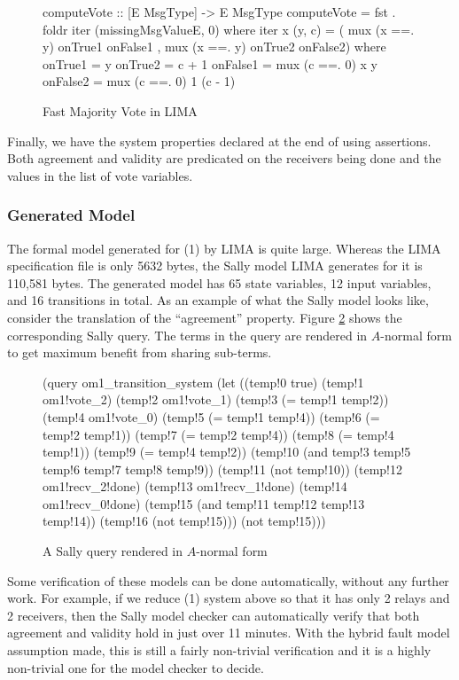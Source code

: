 \begin{figure}
\begin{lima}
computeVote :: [E MsgType] -> E MsgType
computeVote = fst . foldr iter (missingMsgValueE, 0)
  where
    iter x (y, c) = ( mux (x ==. y) onTrue1 onFalse1
                    , mux (x ==. y) onTrue2 onFalse2)
      where
        onTrue1       = y
        onTrue2       = c + 1
        onFalse1      = mux (c ==. 0) x y
        onFalse2      = mux (c ==. 0) 1 (c - 1)
\end{lima}
\caption{Fast Majority Vote in LIMA}
\label{fig:majority-vote}
\end{figure}

Finally, we have the system properties declared at the end of  using
assertions. Both agreement and validity are predicated on the receivers being
done and the values in the list of vote variables.

\subsubsection{Generated Model}\label{sssec:om1-sally-model}

The formal model generated for \OM(1) by LIMA is quite large. Whereas the LIMA
specification file is only 5632 bytes, the Sally model LIMA generates for it
is 110,581 bytes. The generated model has 65 state variables, 12 input
variables, and 16 transitions in total. As an example of what the Sally model
looks like, consider the translation of the ``agreement'' property. Figure
\ref{fig:sally-query} shows the corresponding Sally query. The terms in the
query are rendered in $A$-normal form \cite{Sabry-Felleisen} to get maximum
benefit from sharing sub-terms.

\begin{figure}
\begin{sally}
(query
 om1_transition_system
 (let
  ((temp!0 true)
   (temp!1 om1!vote_2)
   (temp!2 om1!vote_1)
   (temp!3 (= temp!1 temp!2))
   (temp!4 om1!vote_0)
   (temp!5 (= temp!1 temp!4))
   (temp!6 (= temp!2 temp!1))
   (temp!7 (= temp!2 temp!4))
   (temp!8 (= temp!4 temp!1))
   (temp!9 (= temp!4 temp!2))
   (temp!10 (and temp!3 temp!5 temp!6 temp!7 temp!8 temp!9))
   (temp!11 (not temp!10))
   (temp!12 om1!recv_2!done)
   (temp!13 om1!recv_1!done)
   (temp!14 om1!recv_0!done)
   (temp!15 (and temp!11 temp!12 temp!13 temp!14))
   (temp!16 (not temp!15)))
  (not temp!15)))
\end{sally}
\caption{A Sally query rendered in $A$-normal form}
\label{fig:sally-query}
\end{figure}

Some verification of these models can be done automatically, without any
further work. For example, if we reduce \OM(1) system above so that it has
only 2 relays and 2 receivers, then the Sally model checker can automatically
verify that both agreement and validity hold in just over 11 minutes. With the
hybrid fault model assumption made, this is still a fairly non-trivial
verification and it is a highly non-trivial one for the model checker to
decide.

